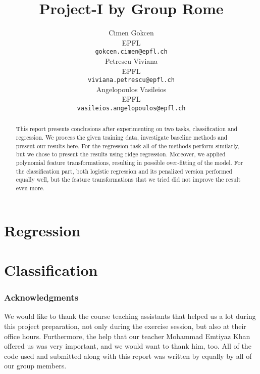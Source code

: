 \documentclass{article} %
\title{Project-I by Group Rome}
\author{
Cimen Gokcen\\
EPFL \\
\fontsize{8}{9}\selectfont
\texttt{gokcen.cimen@epfl.ch} \\
\And
Petrescu Viviana\\
EPFL \\
\fontsize{8}{9}\selectfont
\texttt{viviana.petrescu@epfl.ch} \\
\And
Angelopoulos Vasileios \\
EPFL \\
\fontsize{8}{9}\selectfont
\texttt{vasileios.angelopoulos@epfl.ch} \\
}
\begin{document}
\maketitle

\begin{abstract}
This report presents conclusions after experimenting on two tasks, classification and regression. We process the given training data, investigate baseline methods and present our results here. For the regression task all of the methods perform similarly, but we chose to present the results using ridge regression. Moreover, we applied polynomial feature transformations, resulting in possible over-fitting of the model. For the classification part, both logistic regression and its penalized version performed equally well, but the feature transformations that we tried did not improve the result even more.
\end{abstract}

\section{Regression}


\section{Classification}


\subsubsection*{Acknowledgments}
We would like to thank the course teaching assistants that helped us a lot during this project preparation, not only during the exercise session, but also at their office hours. Furthermore, the help that our teacher Mohammad Emtiyaz Khan offered us was very  important, and we would want to thank him, too. All of the code used and submitted along with this report was written by equally by all of our group members.
\end{document}
